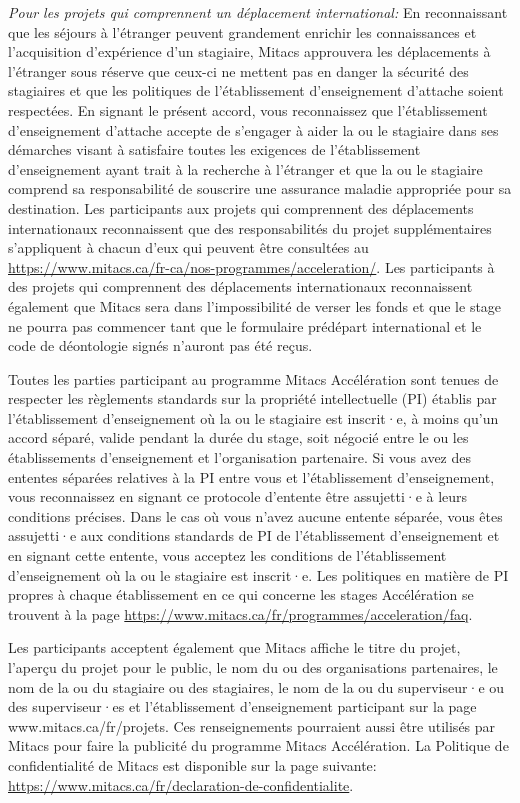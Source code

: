{\textit{Pour les projets qui comprennent un déplacement international:} En reconnaissant que les séjours à l'étranger peuvent grandement enrichir les connaissances et l'acquisition d'expérience d'un stagiaire, Mitacs approuvera les déplacements à l'étranger sous réserve que ceux-ci ne mettent pas en danger la sécurité des stagiaires et que les politiques de l'établissement d'enseignement d'attache soient respectées. En signant le présent accord, vous reconnaissez que l'établissement d'enseignement d'attache accepte de s'engager à aider la ou le stagiaire dans ses démarches visant à satisfaire toutes les exigences de l'établissement d'enseignement ayant trait à la recherche à l'étranger et que la ou le stagiaire comprend sa responsabilité de souscrire une assurance maladie appropriée pour sa destination. Les participants aux projets qui comprennent des déplacements internationaux reconnaissent que des responsabilités du projet supplémentaires s'appliquent à chacun d'eux qui peuvent être consultées au \url{https://www.mitacs.ca/fr-ca/nos-programmes/acceleration/}. Les participants à des projets qui comprennent des déplacements internationaux reconnaissent également que Mitacs sera dans l'impossibilité de verser les fonds et que le stage ne pourra pas commencer tant que le formulaire prédépart international et le code de déontologie signés n'auront pas été reçus.

Toutes les parties participant au programme Mitacs Accélération sont tenues de respecter les règlements standards sur la propriété intellectuelle (PI) établis par l'établissement d'enseignement où la ou le stagiaire est inscrit·e, à moins qu'un accord séparé, valide pendant la durée du stage, soit négocié entre le ou les établissements d'enseignement et l'organisation partenaire. Si vous avez des ententes séparées relatives à la PI entre vous et l'établissement d'enseignement, vous reconnaissez en signant ce protocole d'entente être assujetti·e à leurs conditions précises.  Dans le cas où vous n'avez aucune entente séparée, vous êtes assujetti·e aux conditions standards de PI de l'établissement d'enseignement et en signant cette entente, vous acceptez les conditions de l'établissement d'enseignement où la ou le stagiaire est inscrit·e. Les politiques en matière de PI propres à chaque établissement en ce qui concerne les stages Accélération se trouvent à la page \url{https://www.mitacs.ca/fr/programmes/acceleration/faq}.

Les participants acceptent également que Mitacs affiche le titre du projet, l'aperçu du projet pour le public, le nom du ou des organisations partenaires, le nom de la ou du stagiaire ou des stagiaires, le nom de la ou du superviseur·e ou des superviseur·es et l'établissement d'enseignement participant sur la page www.mitacs.ca/fr/projets. Ces renseignements pourraient aussi être utilisés par Mitacs pour faire la publicité du programme Mitacs Accélération. La Politique de confidentialité de Mitacs est disponible sur la page suivante: \url{https://www.mitacs.ca/fr/declaration-de-confidentialite}.

}
